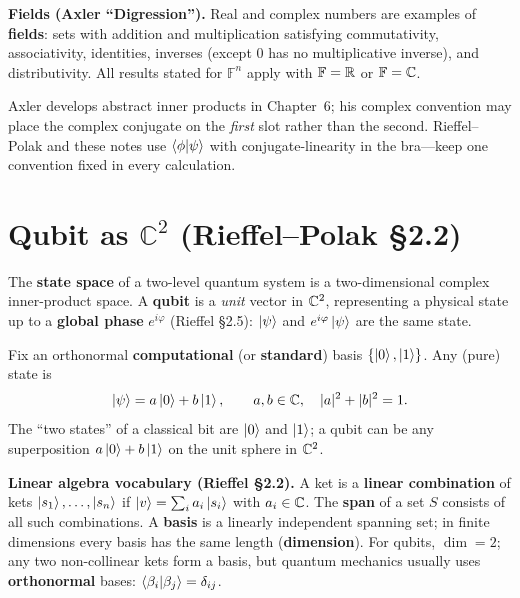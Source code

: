 \textbf{Fields (Axler ``Digression'').} Real and complex numbers are examples of \textbf{fields}: sets with addition and multiplication satisfying commutativity, associativity, identities, inverses (except $0$ has no multiplicative inverse), and distributivity. All results stated for $\mathbb{F}^n$ apply with $\mathbb{F}=\mathbb{R}$ or $\mathbb{F}=\mathbb{C}$.

\begin{remark}
Axler develops abstract inner products in Chapter~6; his complex convention may place the complex conjugate on the \emph{first} slot rather than the second. Rieffel--Polak and these notes use $\left\langle\phi\middle|\psi\right\rangle$ with conjugate-linearity in the bra---keep one convention fixed in every calculation.
\end{remark}

\section{Qubit as $\mathbb{C}^2$ (Rieffel--Polak \S2.2)}

The \textbf{state space} of a two-level quantum system is a two-dimensional complex inner-product space. A \textbf{qubit} is a \emph{unit} vector in $\mathbb{C}^2$, representing a physical state up to a \textbf{global phase} $e^{i\varphi}$ (Rieffel \S2.5): $\left|\psi\right\rangle$ and $e^{i\varphi}\left|\psi\right\rangle$ are the same state.

Fix an orthonormal \textbf{computational} (or \textbf{standard}) basis $\{\left|0\right\rangle,\left|1\right\rangle\}$. Any (pure) state is
\[
\left|\psi\right\rangle=a\left|0\right\rangle+b\left|1\right\rangle,\qquad a,b\in\mathbb{C},\quad |a|^2+|b|^2=1.
\]
The ``two states'' of a classical bit are $\left|0\right\rangle$ and $\left|1\right\rangle$; a qubit can be any superposition $a\left|0\right\rangle+b\left|1\right\rangle$ on the unit sphere in $\mathbb{C}^2$.

\textbf{Linear algebra vocabulary (Rieffel \S2.2).} A ket is a \textbf{linear combination} of kets $\left|s_1\right\rangle,\ldots,\left|s_n\right\rangle$ if $\left|v\right\rangle=\sum_i a_i\left|s_i\right\rangle$ with $a_i\in\mathbb{C}$. The \textbf{span} of a set $S$ consists of all such combinations. A \textbf{basis} is a linearly independent spanning set; in finite dimensions every basis has the same length (\textbf{dimension}). For qubits, $\dim=2$; any two non-collinear kets form a basis, but quantum mechanics usually uses \textbf{orthonormal} bases: $\left\langle\beta_i\middle|\beta_j\right\rangle=\delta_{ij}$.

